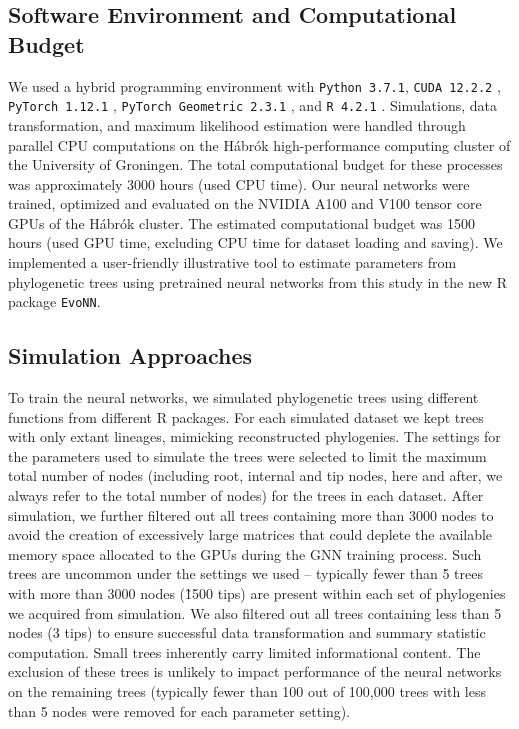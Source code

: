 {\subsection{Software Environment and Computational Budget}
\label{ch2::sec::methods::environment}
We used a hybrid programming environment with \texttt{Python 3.7.1}, \texttt{CUDA 12.2.2} \citep{luebke_cuda_2008}, \texttt{PyTorch 1.12.1} \citep{prakash_pytorch_2021}, \texttt{PyTorch Geometric 2.3.1} \citep{fey_fast_2019}, and \texttt{R 4.2.1} \citep{r_core_team_r_2025}. Simulations, data transformation, and maximum likelihood estimation were handled through parallel CPU computations on the Hábrók high-performance computing cluster of the University of Groningen. The total computational budget for these processes was approximately 3000 hours (used CPU time). Our neural networks were trained, optimized and evaluated on the NVIDIA A100 and V100 tensor core GPUs of the Hábrók cluster. The estimated computational budget was 1500 hours (used GPU time, excluding CPU time for dataset loading and saving). We implemented a user-friendly illustrative tool to estimate parameters from phylogenetic trees using pretrained neural networks from this study in the new R package \texttt{EvoNN}. 

\subsection{Simulation Approaches}
\label{ch2::sec::methods::simulation}
To train the neural networks, we simulated phylogenetic trees using different functions from different R packages. For each simulated dataset we kept trees with only extant lineages, mimicking reconstructed phylogenies. The settings for the parameters used to simulate the trees were selected to limit the maximum total number of nodes (including root, internal and tip nodes, here and after, we always refer to the total number of nodes) for the trees in each dataset. After simulation, we further filtered out all trees containing more than 3000 nodes to avoid the creation of excessively large matrices that could deplete the available memory space allocated to the GPUs during the GNN training process. Such trees are uncommon under the settings we used -- typically fewer than 5 trees with more than 3000 nodes (\~ 1500 tips) are present within each set of phylogenies we acquired from simulation. We also filtered out all trees containing less than 5 nodes (3 tips) to ensure successful data transformation and summary statistic computation. Small trees inherently carry limited informational content. The exclusion of these trees is unlikely to impact performance of the neural networks on the remaining trees (typically fewer than 100 out of 100,000 trees with less than 5 nodes were removed for each parameter setting).

}
